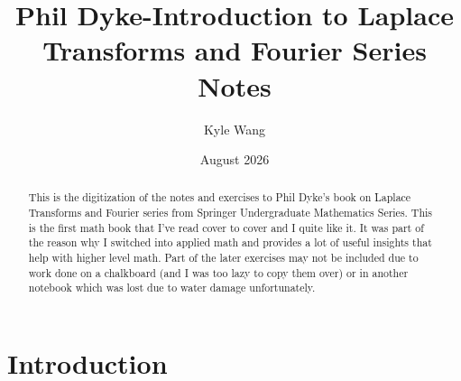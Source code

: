 \documentclass{report}
\title{Phil Dyke-Introduction to Laplace Transforms and Fourier Series Notes}
\author{Kyle Wang}
\date{August 2026}
\theoremstyle{definition}
\theoremstyle{remark}
\begin{document}
\maketitle
\newpage
\begin{abstract}
    This is the digitization of the notes and exercises to Phil Dyke's book on Laplace Transforms and Fourier series from Springer Undergraduate Mathematics Series. This is the first math book that I've read cover to cover and I quite like it. It was part of the reason why I switched into applied math and provides a lot of useful insights that help with higher level math. Part of the later exercises may not be included due to work done on a chalkboard (and I was too lazy to copy them over) or in another notebook which was lost due to water damage unfortunately.
\end{abstract}
\newpage
\tableofcontents
\newpage
\chapter{Introduction}
\end{document}
